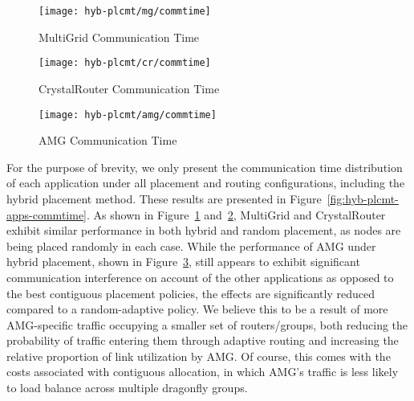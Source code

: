 
\begin{figure*}[t!]
    \centering
    \begin{subfigure}[t]{0.32\textwidth}
        \centering
        \texttt{[image: hyb-plcmt/mg/commtime]}
        \caption{MultiGrid Communication Time}
        \label{fig:hyb-plcmt-mg-commtime}
    \end{subfigure}\hfill
    \begin{subfigure}[t]{0.32\textwidth}
        \centering
        \texttt{[image: hyb-plcmt/cr/commtime]}
        \caption{CrystalRouter Communication Time}
        \label{fig:hyb-plcmt-cr-commtime}
    \end{subfigure}\hfill
    \begin{subfigure}[t]{0.32\textwidth}
        \centering
        \texttt{[image: hyb-plcmt/amg/commtime]}
        \caption{AMG Communication Time}
        \label{fig:hyb-plcmt-amg-commtime}
    \end{subfigure}
   \caption{Application communication time. Workload~ is running with all placement and routing configurations. Methods prefixed with ``H'' represent the hybrid allocation approach.}
   \label{fig:hyb-plcmt-apps-commtime}
\end{figure*}

For the purpose of brevity, we only present the
communication time distribution of each application under all placement and routing configurations, including the hybrid placement method. These results are presented in Figure~\ref{fig:hyb-plcmt-apps-commtime}. 
As shown in Figure~\ref{fig:hyb-plcmt-mg-commtime} and~\ref{fig:hyb-plcmt-cr-commtime},
MultiGrid and CrystalRouter exhibit similar performance in both hybrid and random placement, as nodes are being placed randomly in each case.
While the performance of AMG under hybrid placement, shown in Figure~\ref{fig:hyb-plcmt-amg-commtime}, still appears to exhibit significant communication interference on account of the other applications as opposed to the best contiguous placement policies, the effects are significantly reduced compared to a random-adaptive policy. We believe this to be a result of more AMG-specific traffic occupying a smaller set of routers/groups, both reducing the probability of traffic entering them through adaptive routing and increasing the relative proportion of link utilization by AMG. Of course, this comes with the costs associated with contiguous allocation, in which AMG's traffic is less likely to load balance across multiple dragonfly groups.

